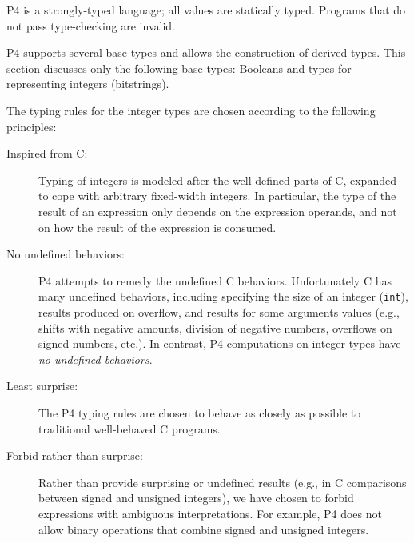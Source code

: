 \documentclass[12pt]{article}
\begin{document}

\newtoggle{conditionalExpression}
\togglefalse{conditionalExpression}

\newcommand{\code}[1]{\texttt{#1}}
\newcommand{\bool}{\code{\textbf{bool}}}
\newcommand{\infint}{\code{\textbf{int}}}
\newcommand{\W}{\code{\emph{W}}}
\newcommand{\Wone}{\code{\emph{W1}}}
\newcommand{\bit}[1]{\code{\textbf{bit}<#1>}}
\newcommand{\Int}[1]{\code{\textbf{int}<#1>}}
\newlength{\descwidth}
\setlength{\descwidth}{12cm}

P4 is a strongly-typed language; all values are statically
typed. Programs that do not pass type-checking are invalid.

P4 supports several base types and allows the construction of derived
types.  This section discusses only the following base types: Booleans
and types for representing integers (bitstrings).


The typing rules for the integer types are chosen according to the
following principles:

\begin{description}
\item[Inspired from C:] Typing of integers is modeled after the
  well-defined parts of C, expanded to cope with arbitrary fixed-width
  integers.  In particular, the type of the result of an expression
  only depends on the expression operands, and not on how the result
  of the expression is consumed.
\item[No undefined behaviors:] P4 attempts to remedy the undefined C
  behaviors.  Unfortunately C has many undefined behaviors, including
  specifying the size of an integer (\code{int}), results produced on
  overflow, and results for some arguments values (e.g., shifts with
  negative amounts, division of negative numbers, overflows on signed
  numbers, etc.).  In contrast, P4 computations on integer types have
  \emph{no undefined behaviors}.
\item[Least surprise:] The P4 typing rules are chosen to behave as
  closely as possible to traditional well-behaved C programs.
\item[Forbid rather than surprise:] Rather than provide surprising or
  undefined results (e.g., in C comparisons between signed and
  unsigned integers), we have chosen to forbid expressions with
  ambiguous interpretations.  For example, P4 does not allow binary
  operations that combine signed and unsigned integers.
\end{description}
\end{document}

